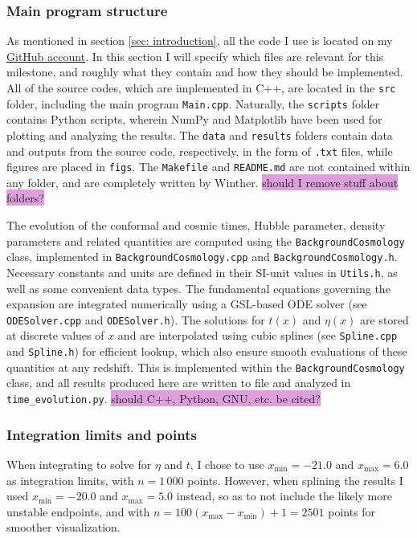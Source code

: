 \documentclass{aa}
\begin{document}
\subsubsection{Main program structure}
As mentioned in section \ref{sec: introduction}, all the code I use is located on my \href{https://github.com/paljettrosa/AST5220}{GitHub account}. In this section I will specify which files are relevant for this milestone, and roughly what they contain and how they should be implemented. All of the source codes, which are implemented in C++, are located in the \verb|src| folder, including the main program \verb|Main.cpp|. Naturally, the \verb|scripts| folder contains Python scripts, wherein NumPy and Matplotlib have been used for plotting and analyzing the results. The \verb|data| and \verb|results| folders contain data and outputs from the source code, respectively, in the form of \verb|.txt| files, while figures are placed in \verb|figs|. The \verb|Makefile| and \verb|README.md| are not contained within any folder, and are completely written by Winther. \colorbox{Plum}{should I remove stuff about folders?}

The evolution of the conformal and cosmic times, Hubble parameter, density parameters and related quantities are computed using the \verb|BackgroundCosmology| class, implemented in \verb|BackgroundCosmology.cpp| and \verb|BackgroundCosmology.h|. Necessary constants and units are defined in their SI-unit values in \verb|Utils.h|, as well as some convenient data types. The fundamental equations governing the expansion are integrated numerically using a GSL-based ODE solver (see \verb|ODESolver.cpp| and \verb|ODESolver.h|). The solutions for $t(x)$ and $\eta(x)$ are stored at discrete values of $x$ and are interpolated using cubic splines (see \verb|Spline.cpp| and \verb|Spline.h|) for efficient lookup, which also ensure smooth evaluations of these quantities at any redshift. This is implemented within the \verb|BackgroundCosmology| class, and all results produced here are written to file and analyzed in \verb|time_evolution.py|. \colorbox{Plum}{should C++, Python, GNU, etc. be cited?}


\subsubsection{Integration limits and points}
When integrating to solve for $\eta$ and $t$, I chose to use $x_\text{min}=-21.0$ and $x_\text{max}=6.0$ as integration limits, with $n=1\,000$ points. However, when splining the results I used $x_\text{min}=-20.0$ and $x_\text{max}=5.0$ instead, so as to not include the likely more unstable endpoints, and with $n=100(x_\text{max}-x_\text{min})+1=2501$ points for smoother visualization.
\end{document}
